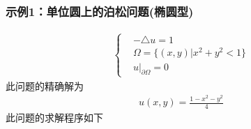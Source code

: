         \subsubsection{示例1：单位圆上的泊松问题(椭圆型)}
            \par
            \begin{align*}
                \left\{
                \begin{aligned}
                &-\triangle u = 1\\
                &\Omega = \{(x,y)|x^2+y^2<1\}\\
                &u\bigl|_{\partial \Omega} = 0
                \end{aligned}
                \right.
            \end{align*}
            此问题的精确解为
            \begin{align*}
                u(x,y) = \frac{1-x^2-y^2}{4}
            \end{align*}
            此问题的求解程序如下

